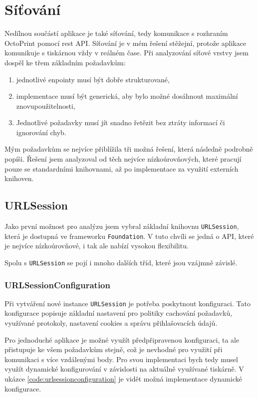 \section{Síťování}\label{analyza-sitovani}

Nedílnou součástí aplikace je také síťování, tedy komunikace s rozhraním OctoPrint pomocí \acrshort{rest} API.
Síťování je v mém řešení stěžejní, protože aplikace komunikuje s tiskárnou vždy v reálném čase.
Při analyzování síťové vrstvy jsem dospěl ke třem základním požadavkům:

\begin{enumerate}
    \item jednotlivé enpointy musí být dobře strukturované,
    \item implementace musí být generická, aby bylo možné dosáhnout maximální znovupoužitelnosti,
    \item Jednotlivé požadavky musí jít snadno řetězit bez ztráty informací či ignorování chyb.
\end{enumerate}

Mým požadavkům se nejvíce přiblížila tři možná řešení, která následně podrobně popíši.
Řešení jsem analyzoval od těch nejvíce nízkoúrovňových, které pracují pouze se standardními knihovnami, až po implementace za využití externích knihoven.

\subsection{URLSession}

Jako první možnost pro analýzu jsem vybral základní knihovnu \texttt{URLSession}, která je dostupná ve frameworku \texttt{Foundation}.
V tuto chvíli se jedná o API, které je nejvíce nízkoúrovňové, i tak ale nabízí vysokou flexibilitu.

Spolu s \texttt{URLSession} se pojí i mnoho dalších tříd, které jsou vzájmně závislé.

\subsubsection*{URLSessionConfiguration}

Při vytváření nové instance \texttt{URLSession} je potřeba poskytnout konfiguraci.
Tato konfigurace popisuje základní nastavení pro politiky cachování požadavků, využívané protokoly, nastavení cookies a správu přihlašovacích údajů.

Pro jednoduché aplikace je možné využít předpřipravenou konfiguraci, ta ale přistupuje ke všem požadavkům stejně, což je nevhodné pro využití při komunikaci s více vzdálenými body.
Pro svou implementaci bych tedy musel využít dynamické konfigurování v závislosti na aktuálně využívané tiskárně.
V ukázce \ref{code:urlsessionconfiguration} je vidět možná implementace dynamické konfigurace.

